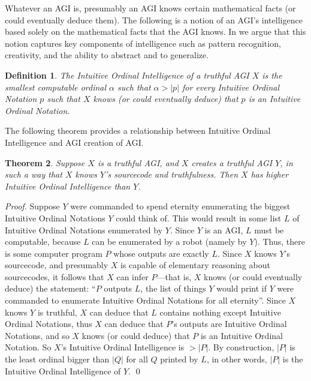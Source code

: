 \documentclass[runningheads]{llncs}
\newtheorem{mytheorem}{Theorem}
\newtheorem{mydefinition}[mytheorem]{Definition}
\begin{document}
Whatever an AGI is, presumably an AGI knows certain mathematical facts
(or could eventually deduce them).
The following is a notion of an AGI's intelligence based
solely on the mathematical facts that the AGI knows. In \cite{alexander2019measuring}
we argue that this notion captures key components of intelligence such as
pattern recognition, creativity, and the ability to abstract and to
generalize.

\begin{mydefinition}
\label{maindefinition}
    The \emph{Intuitive Ordinal Intelligence} of a truthful AGI $X$ is the smallest computable
    ordinal $\alpha$ such that $\alpha>|p|$ for every Intuitive Ordinal Notation
    $p$ such that $X$ knows (or could eventually deduce) that $p$ is an
    Intuitive Ordinal Notation.
\end{mydefinition}

The following theorem provides a relationship between Intuitive Ordinal Intelligence
and AGI creation of AGI.

\begin{mytheorem}
\label{maintheorem}
    Suppose $X$ is a truthful AGI, and $X$ creates a truthful AGI $Y$,
    in such a way that $X$ knows $Y$'s sourcecode and truthfulness. Then
    $X$ has higher Intuitive Ordinal Intelligence than $Y$.
\end{mytheorem}

\begin{proof}
    Suppose $Y$ were commanded to
    spend eternity enumerating the biggest Intuitive Ordinal Notations $Y$ could
    think of. This would result in some list $L$ of Intuitive Ordinal Notations
    enumerated by $Y$. Since $Y$ is an AGI, $L$ must be computable, because $L$ can
    be enumerated by a robot (namely by $Y$). Thus, there is some computer program
    $P$ whose outputs are exactly $L$. Since $X$ knows $Y$'s sourcecode,
    and presumably $X$ is capable of elementary reasoning about sourcecodes,
    it follows that $X$ can infer $P$---that is,
    $X$ knows (or could eventually deduce) the statement: ``$P$ outputs
    $L$, the list of things $Y$ would print if $Y$ were commanded to enumerate
    Intuitive Ordinal Notations for all eternity''. Since $X$ knows $Y$ is truthful,
    $X$ can deduce that $L$ contains nothing except Intuitive Ordinal Notations,
    thus $X$ can deduce that $P$'s outputs are Intuitive Ordinal Notations,
    and so $X$ knows (or could deduce) that $P$ is an Intuitive Ordinal Notation.
    So $X$'s Intuitive Ordinal Intelligence is $>|P|$. By construction, $|P|$ is
    the least ordinal bigger than $|Q|$ for all $Q$ printed by $L$, in other words,
    $|P|$ is the Intuitive Ordinal Intelligence of $Y$.
    \qed
\end{proof}
\end{document}
